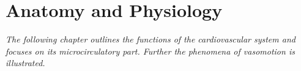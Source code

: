 \chapter{Anatomy and Physiology}
\textit{The following chapter outlines the functions of the cardiovascular system and focuses on its microcirculatory part. Further the phenomena of vasomotion is illustrated.}